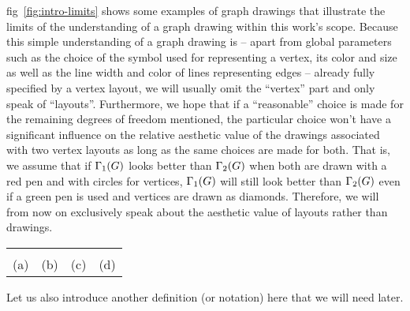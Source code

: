 \documentclass{graphstudy}
\begin{document}
\Acl{fig}~\ref{fig:intro-limits} shows some examples of graph drawings that illustrate the limits of the understanding
of a graph drawing within this work's scope.  Because this simple understanding of a graph drawing is -- apart from
global parameters such as the choice of the symbol used for representing a vertex, its color and size as well as the
line width and color of lines representing edges -- already fully specified by a vertex layout, we will usually omit the
\enquote{vertex} part and only speak of \enquote{layouts}.  Furthermore, we hope that if a \enquote{reasonable} choice
is made for the remaining degrees of freedom mentioned, the particular choice won't have a significant influence on the
relative aesthetic value of the drawings associated with two vertex layouts as long as the same choices are made for
both.  That is, we assume that if \(\Gamma_1(G)\) looks better than \(\Gamma_2(G)\) when both are drawn with
a red pen and with circles for vertices, \(\Gamma_1(G)\) will still look better than \(\Gamma_2(G)\) even if
a green pen is used and vertices are drawn as diamonds.  Therefore, we will from now on exclusively speak about the
aesthetic value of layouts rather than drawings.

\begin{Figure}
  \begin{center}
    \begin{tabular}{c@{\qquad}c@{\qquad}c@{\qquad}c}
      &
      &
      &
      \\[2ex]
      (a) & (b) & (c) & (d)\\
    \end{tabular}
  \end{center}
  \caption[Graphs drawings (not) considered within the scope of this work]{%
    The picture in (a) shows an example of a graph drawing as we consider it in this work.  Picture (b) is out of scope
    for this work because the edges have bends.  So is picture (c) because the edges have kinks and one node is a ground
    symbol.  Picture (d) is off limits too because the nodes are labeled and the graph has multiple edges in the form of
    the C=O carbonyl double-bond.
  }
  \label{fig:intro-limits}
\end{Figure}

Let us also introduce another definition (or notation) here that we will need later.
\end{document}
